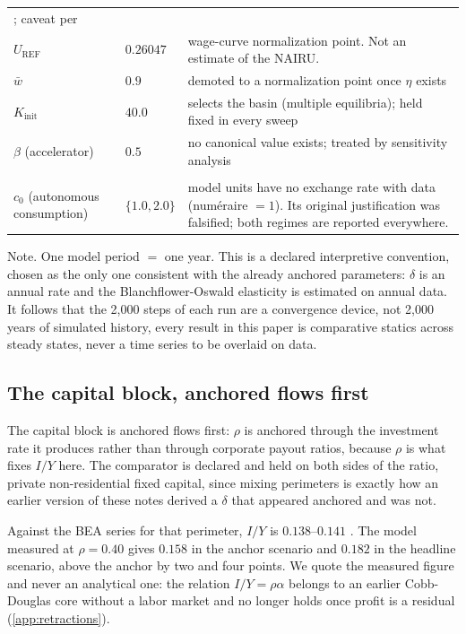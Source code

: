 \begin{table}[htbp]
\begin{threeparttable}
\begin{tabularx}{\textwidth}{llX}
  \citep{KlumpDeLaGrandville2000}; caveat per \citet{Temple2012}\\
$U_{\mathrm{REF}}$ & $0.26047$ & wage-curve normalization point.
  Not an estimate of the NAIRU.\\
$\bar{w}$ & $0.9$ & demoted to a normalization point once $\eta$ exists\\
$K_{\text{init}}$ & $40.0$ & selects the basin (multiple equilibria);
  held fixed in every sweep\\
$\beta$ (accelerator) & $0.5$ & no canonical value exists; treated by
  sensitivity analysis\\
\addlinespace[4pt]
\multicolumn{3}{l}{Declared non-anchorable}\\
\addlinespace[2pt]
$c_0$ (autonomous consumption) & $\{1.0, 2.0\}$ & model units have no exchange
  rate with data (numéraire $=1$). Its original justification was
  falsified; both regimes are reported everywhere.\\
\bottomrule
\end{tabularx}
\begin{tablenotes}[flushleft]\footnotesize
\item Note. One model period $=$ one year. This is a declared
interpretive convention, chosen as the only one consistent with the already
anchored parameters: $\delta$ is an annual rate and the Blanchflower-Oswald
elasticity is estimated on annual data. It follows that the 2{,}000 steps of
each run are a convergence device, not 2{,}000 years of simulated
history, every result in this paper is comparative statics across steady
states, never a time series to be overlaid on data.
\end{tablenotes}
\end{threeparttable}
\end{table}

\subsection{The capital block, anchored flows first}

The capital block is anchored flows first: $\rho$ is anchored through
the investment rate it produces rather than through corporate payout ratios,
because $\rho$ is what fixes $I/Y$ here. The comparator is declared and held on
both sides of the ratio, private non-residential fixed capital, 
since mixing perimeters is exactly how an earlier version of these notes
derived a $\delta$ that appeared anchored and was not.

Against the BEA series for that perimeter, $I/Y$ is $0.138$--$0.141$
\citep{FRED_PNFI}. The model measured at $\rho = 0.40$ gives $0.158$ in
the anchor scenario and $0.182$ in the headline scenario, above the anchor by
two and four points. We quote the measured figure and never an analytical one:
the relation $I/Y = \rho\alpha$ belongs to an earlier Cobb-Douglas core without
a labor market and no longer holds once profit is a residual
(\cref{app:retractions}).

